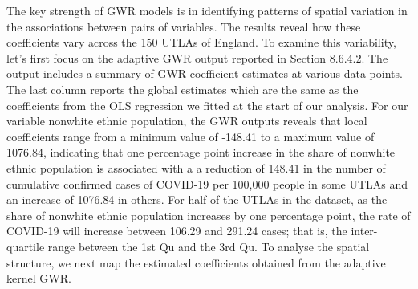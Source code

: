 \documentclass[
]{book}
\begin{document}
The key strength of GWR models is in identifying patterns of spatial variation in the associations between pairs of variables. The results reveal how these coefficients vary across the 150 UTLAs of England. To examine this variability, let's first focus on the adaptive GWR output reported in Section 8.6.4.2. The output includes a summary of GWR coefficient estimates at various data points. The last column reports the global estimates which are the same as the coefficients from the OLS regression we fitted at the start of our analysis. For our variable nonwhite ethnic population, the GWR outputs reveals that local coefficients range from a minimum value of -148.41 to a maximum value of 1076.84, indicating that one percentage point increase in the share of nonwhite ethnic population is associated with a a reduction of 148.41 in the number of cumulative confirmed cases of COVID-19 per 100,000 people in some UTLAs and an increase of 1076.84 in others. For half of the UTLAs in the dataset, as the share of nonwhite ethnic population increases by one percentage point, the rate of COVID-19 will increase between 106.29 and 291.24 cases; that is, the inter-quartile range between the 1st Qu and the 3rd Qu. To analyse the spatial structure, we next map the estimated coefficients obtained from the adaptive kernel GWR.
\end{document}
